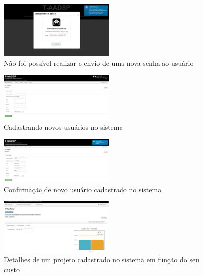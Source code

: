 \documentclass{acm_proc_article-sp}
\begin{document}
\begin{appendices}
\begin{figure}[h]
\centering %
\includegraphics[width=0.5\textwidth]{RF_autenticacao_falha_ao_enviar_senha.jpg} %
\caption{Não foi possível realizar o envio de uma nova senha ao usuário}
\end{figure}

\begin{figure}[h]
\centering %
\includegraphics[width=0.5\textwidth]{RF_cadastro_de_usuario.jpg} %
\caption{Cadastrando novos usuários no sistema}
\end{figure}

\begin{figure}[h]
\centering %
\includegraphics[width=0.5\textwidth]{RF_cadastro_de_usuario_realizado.jpg} %
\caption{Confirmação de novo usuário cadastrado no sistema}
\end{figure}

\begin{figure}[h]
\centering %
\includegraphics[width=0.5\textwidth]{RF_detalhamento_Projeto.jpg} %
\caption{Detalhes de um projeto cadastrado no sistema em função do seu custo}
\end{figure}


\end{appendices}
\end{document}
